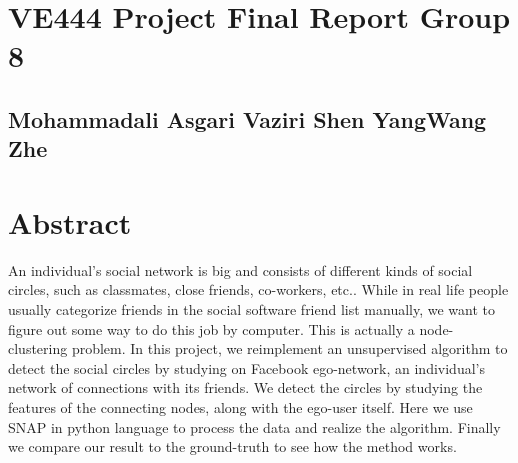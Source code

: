 \documentclass[12pt,a4paper]{article}
\begin{document}
\section*{VE444 \quad Project Final Report \quad Group 8}
\subsection*{Mohammadali Asgari Vaziri \qquad Shen Yang\qquad Wang Zhe}


\section*{Abstract}
\par An individual's social network is big and consists of different kinds of social circles, such as classmates, close friends, co-workers, etc.. While in real life people usually categorize friends in the social software friend list manually, we want to figure out some way to do this job by computer. This is actually a node-clustering problem. In this project, we reimplement an unsupervised algorithm to detect the social circles by studying on Facebook ego-network, an individual's network of connections with its friends. We detect the circles by studying the features of the connecting nodes, along with the ego-user itself. Here we use SNAP in python language to process the data and realize the algorithm. Finally we compare our result to the ground-truth to see how the method works.
\end{document}
